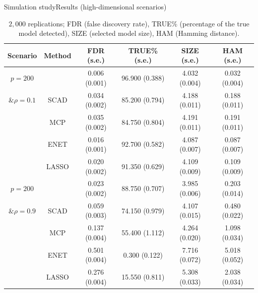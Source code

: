 \documentclass[citecolor=blue,10pt]{beamer}
\newcommand{\0} {\mbox{\boldmath$0$}}
\begin{document}
\begin{frame}{Simulation study}{Results (high-dimensional scenarios)}
{\footnotesize
\begin{table}[H]
 \centering 
 \caption{$2,000$ replications; FDR (false discovery rate), TRUE\% (percentage of the true model detected), SIZE (selected model size), HAM (Hamming distance).}\label{T:sim1}
 \begin{tabular}{cc|c|c|c|c}
  \hline
  Scenario & Method                         & FDR  (s.e.)    & TRUE\% (s.e.)   & SIZE (s.e.)     & HAM (s.e.)    \\
  \hline
$p=200$ & {\color{red}{Proposed}} & 0.006 (0.001)  & 96.900 (0.388)  & 4.032 (0.004)    & 0.032 (0.004) \\
$\&\rho=0.1$& SCAD                           & 0.034 (0.002)  & 85.200 (0.794)  & 4.188 (0.011)   & 0.188 (0.011) \\
           & MCP                            & 0.035 (0.002)  & 84.750 (0.804)  & 4.191 (0.011)   & 0.191 (0.011) \\
           & ENET                           & 0.016 (0.001)  & 92.700 (0.582)  & 4.087 (0.007)   & 0.087 (0.007) \\
           & LASSO                          & 0.020 (0.002)  & 91.350 (0.629)  & 4.109 (0.009)   & 0.109 (0.009) \\
  \hline
$p=200$           & {\color{red}{Proposed}} & 0.023  (0.002) & 88.750  (0.707) & 3.985 (0.006)  & 0.203 (0.014) \\
$\&\rho=0.9$ & SCAD                           & 0.059 (0.003)  & 74.150 (0.979)  & 4.107 (0.015)   & 0.480 (0.022) \\
           & MCP                            & 0.137 (0.004)  & 55.400 (1.112)  & 4.264 (0.020)   & 1.098 (0.034) \\
           & ENET                           & 0.501 (0.004)  & 0.300 (0.122)   & 7.716 (0.072)   & 5.018 (0.052) \\
           & LASSO                          & 0.276 (0.004)  & 15.550 (0.811)  & 5.308 (0.033)   & 2.038 (0.034) \\
  \hline
 \end{tabular}
\end{table}}
\end{frame}
\end{document}
